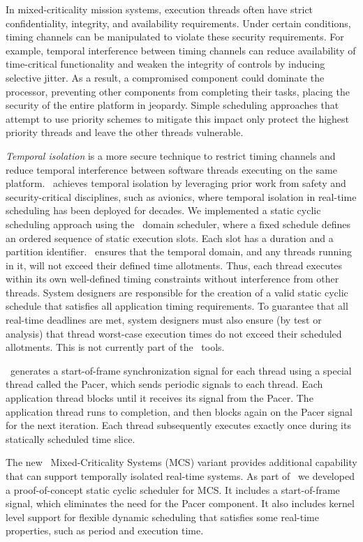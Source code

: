 
In mixed-criticality mission systems,
execution threads often 
have strict confidentiality, integrity, and availability requirements. 
Under certain conditions,
timing channels can be manipulated to violate these security requirements. 
For example, temporal interference between timing channels
can reduce availability of time-critical functionality 
and weaken the integrity of controls by inducing selective jitter.
As a result, a compromised component could dominate the processor, 
preventing other components from completing their tasks, placing the security 
of the entire platform in jeopardy. 
Simple scheduling approaches that attempt to use priority schemes to mitigate 
this impact only protect the highest priority threads and leave the other
threads vulnerable.

\emph{Temporal isolation} is a more secure technique to restrict timing channels and
reduce temporal interference between software threads executing on the same platform. 
\briefcase\ achieves temporal isolation by leveraging
prior work from safety and security-critical disciplines, such as
avionics, where temporal isolation in real-time scheduling has been
deployed for decades.
We implemented a static cyclic scheduling
approach using the \selFour\ domain scheduler, where a fixed schedule
defines an ordered sequence of static execution slots. Each slot has a
duration and a partition identifier.  \selFour\ ensures that the
temporal domain, and any threads running in it, will not exceed their defined
time allotments. Thus, each thread executes within its own
well-defined timing constraints without interference from other threads.
System designers are responsible for the
creation of a valid static cyclic schedule that
satisfies all application timing requirements.
To guarantee that all real-time deadlines are met, system designers must 
also ensure (by test or analysis) that thread worst-case execution times
do not exceed their scheduled allotments.  This is not currently part of 
the \briefcase\ tools.  

\briefcase\ generates a start-of-frame synchronization signal for each thread using
a special thread called the Pacer, which sends periodic signals
to each thread. Each application thread blocks until it receives its
signal from the Pacer. The application thread runs to completion, and then
blocks again on the Pacer signal for the next iteration. 
Each thread subsequently executes
exactly once during its statically scheduled time slice.

The new \selFour\ Mixed-Criticality Systems (MCS) variant provides
additional capability that can support temporally isolated
real-time systems. 
As part of \briefcase\ we developed a proof-of-concept static cyclic
scheduler for MCS.
It includes a start-of-frame signal, which
eliminates the need for the Pacer component. It also includes kernel
level support for flexible dynamic scheduling that satisfies some
real-time properties, such as period and execution time.

